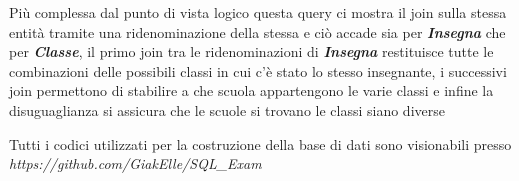 \documentclass{article}
\begin{document}
\vspace{0.5 cm}

Più complessa dal punto di vista logico questa query ci mostra il join sulla stessa entità tramite una ridenominazione della stessa e ciò accade sia per \textit{\textbf{Insegna}} che per \textit{\textbf{Classe}}, il primo join tra le ridenominazioni di \textit{\textbf{Insegna}} restituisce tutte le combinazioni delle possibili classi in cui c’è stato lo stesso insegnante, i successivi join permettono di stabilire a che scuola appartengono le varie classi e infine la disuguaglianza si assicura che le scuole si trovano le classi siano diverse

\vspace{11.2 cm}
Tutti i codici utilizzati per la costruzione della base di dati sono visionabili presso \textit{https://github.com/GiakElle/SQL\_Exam}
\textit{\textbf{}}
\end{document}
